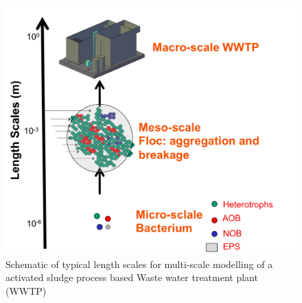 \documentclass[11pt,a4paper,openright]{article}
\begin{document}
\begin{figure}[!htb]
\begin{center}
  \includegraphics[width=0.5\columnwidth]{Figs/lengthscales.png}
\caption{Schematic of typical length scales for multi-scale modelling of a activated sludge process based Waste water treatment plant (WWTP)}
\label{fig:lscale}       %
\end{center}
\end{figure}  
 
\end{document}
